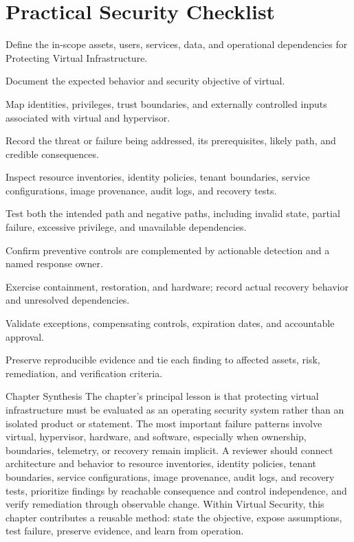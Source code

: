 \documentclass[11pt,letterpaper]{article}
\begin{document}
\section*{Practical Security Checklist}
\begin{CornellChecklist}
\item Define the in-scope assets, users, services, data, and operational dependencies for Protecting Virtual Infrastructure.
\item Document the expected behavior and security objective of virtual.
\item Map identities, privileges, trust boundaries, and externally controlled inputs associated with virtual and hypervisor.
\item Record the threat or failure being addressed, its prerequisites, likely path, and credible consequences.
\item Inspect resource inventories, identity policies, tenant boundaries, service configurations, image provenance, audit logs, and recovery tests.
\item Test both the intended path and negative paths, including invalid state, partial failure, excessive privilege, and unavailable dependencies.
\item Confirm preventive controls are complemented by actionable detection and a named response owner.
\item Exercise containment, restoration, and hardware; record actual recovery behavior and unresolved dependencies.
\item Validate exceptions, compensating controls, expiration dates, and accountable approval.
\item Preserve reproducible evidence and tie each finding to affected assets, risk, remediation, and verification criteria.
\end{CornellChecklist}
\begin{CornellSummaryBox}{Chapter Synthesis}
The chapter's principal lesson is that protecting virtual infrastructure must be evaluated as an operating security system rather than an isolated product or statement. The most important failure patterns involve virtual, hypervisor, hardware, and software, especially when ownership, boundaries, telemetry, or recovery remain implicit. A reviewer should connect architecture and behavior to resource inventories, identity policies, tenant boundaries, service configurations, image provenance, audit logs, and recovery tests, prioritize findings by reachable consequence and control independence, and verify remediation through observable change. Within Virtual Security, this chapter contributes a reusable method: state the objective, expose assumptions, test failure, preserve evidence, and learn from operation.
\end{CornellSummaryBox}
\end{document}
